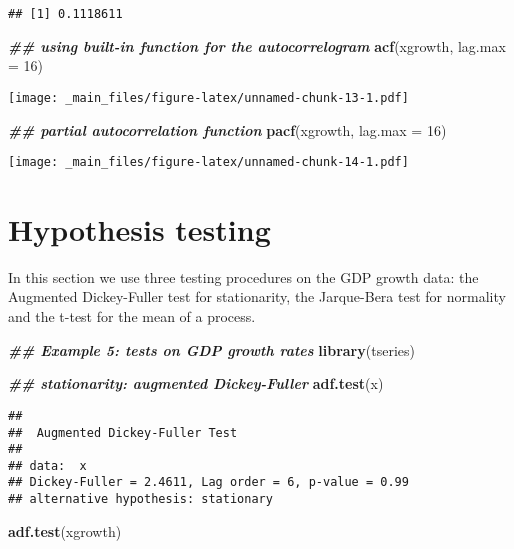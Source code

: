 \documentclass[
]{book}
\newenvironment{Shaded}{\begin{snugshade}}{\end{snugshade}}
\newcommand{\AttributeTok}[1]{\textcolor[rgb]{0.13,0.29,0.53}{#1}}
\newcommand{\DecValTok}[1]{\textcolor[rgb]{0.00,0.00,0.81}{#1}}
\newcommand{\DocumentationTok}[1]{\textcolor[rgb]{0.56,0.35,0.01}{\textbf{\textit{#1}}}}
\newcommand{\FunctionTok}[1]{\textcolor[rgb]{0.13,0.29,0.53}{\textbf{#1}}}
\newcommand{\NormalTok}[1]{#1}
\begin{document}
\begin{verbatim}
## [1] 0.1118611
\end{verbatim}

\begin{Shaded}
\begin{Highlighting}[]
\DocumentationTok{\#\# using built{-}in function for the autocorrelogram}
\FunctionTok{acf}\NormalTok{(xgrowth, }\AttributeTok{lag.max =} \DecValTok{16}\NormalTok{)}
\end{Highlighting}
\end{Shaded}

\texttt{[image: \_main\_files/figure-latex/unnamed-chunk-13-1.pdf]}

\begin{Shaded}
\begin{Highlighting}[]
\DocumentationTok{\#\# partial autocorrelation function}
\FunctionTok{pacf}\NormalTok{(xgrowth, }\AttributeTok{lag.max =} \DecValTok{16}\NormalTok{)}
\end{Highlighting}
\end{Shaded}

\texttt{[image: \_main\_files/figure-latex/unnamed-chunk-14-1.pdf]}

\hypertarget{hypothesis-testing}{%
\section{Hypothesis testing}\label{hypothesis-testing}}

In this section we use three testing procedures on the GDP growth data: the Augmented Dickey-Fuller test for stationarity, the Jarque-Bera test for normality and the t-test for the mean of a process.

\begin{Shaded}
\begin{Highlighting}[]
\DocumentationTok{\#\# Example 5: tests on GDP growth rates }
\FunctionTok{library}\NormalTok{(tseries)}

\DocumentationTok{\#\# stationarity: augmented Dickey{-}Fuller}
\FunctionTok{adf.test}\NormalTok{(x)}
\end{Highlighting}
\end{Shaded}

\begin{verbatim}
## 
##  Augmented Dickey-Fuller Test
## 
## data:  x
## Dickey-Fuller = 2.4611, Lag order = 6, p-value = 0.99
## alternative hypothesis: stationary
\end{verbatim}

\begin{Shaded}
\begin{Highlighting}[]
\FunctionTok{adf.test}\NormalTok{(xgrowth)}
\end{Highlighting}
\end{Shaded}
\end{document}
